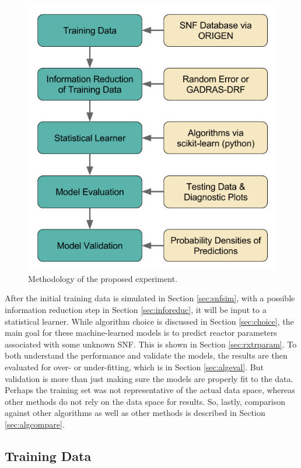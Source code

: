 \begin{figure}[!htb]
  \includegraphics[width=0.9\linewidth]{./chapters/demo_method/methodology.png}
  \caption{Methodology of the proposed experiment.}
  \label{fig:method}
\end{figure}

After the initial training data is simulated in Section \ref{sec:snfsim}, with
a possible information reduction step in Section \ref{sec:inforeduc}, it will
be input to a statistical learner. While algorithm choice is discussed in
Section \ref{sec:choice}, the main goal for these machine-learned models is to
predict reactor parameters associated with some unknown \gls{SNF}. This is
shown in Section \ref{sec:rxtrparam}. To both understand the performance and
validate the models, the results are then evaluated for over- or under-fitting,
which is in Section \ref{sec:algeval}.  But validation is more than just making
sure the models are properly fit to the data.  Perhaps the training set was not
representative of the actual data space, whereas other methods do not rely on
the data space for results. So, lastly, comparison against other algorithms as
well as other methods is described in Section \ref{sec:algcompare}.

\subsection{Training Data}
\label{sec:training}


